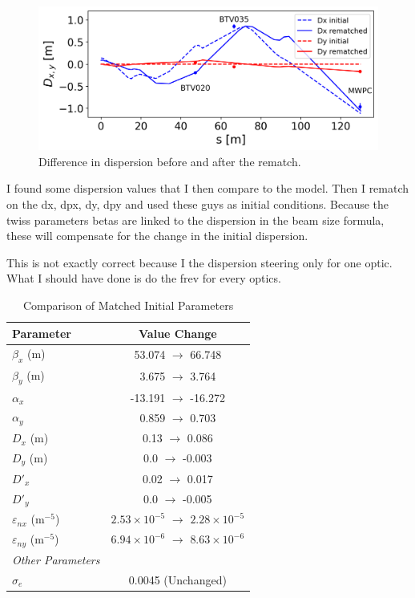 \documentclass[a4paper,
               ]{jacow}
\begin{document}
\begin{figure}[!htb]
   \centering
   \includegraphics*[width=1.0\columnwidth]{dispersion_diff.png}
   \caption{Difference in dispersion before and after the rematch.}
   \label{fig:dispersion}
\end{figure}

I found some dispersion values that I then compare to the model. Then I rematch on the dx, dpx, dy, dpy and used these guys as initial conditions. Because the twiss parameters betas are linked to the dispersion in the beam size formula, these will compensate for the change in the initial dispersion.

This is not exactly correct because I the dispersion steering only for one optic. What I should have done is do the frev for every optics.

\begin{table}[h!]
    \centering
    \caption{Comparison of Matched Initial Parameters}
    \label{tab:initial_conditions_comparison_single_col}
    \begin{tabular}{l c}
        \hline
        Parameter & Value Change \\
        \hline
        $\beta_x$ (m) & 53.074 \(\rightarrow\) 66.748 \\
        $\beta_y$ (m) & 3.675 \(\rightarrow\) 3.764 \\
        $\alpha_x$ & -13.191 \(\rightarrow\) -16.272 \\
        $\alpha_y$ & 0.859 \(\rightarrow\) 0.703 \\
        $D_x$ (m) & 0.13 \(\rightarrow\) 0.086 \\
        $D_y$ (m) & 0.0 \(\rightarrow\) -0.003 \\
        $D'_x$ & 0.02 \(\rightarrow\) 0.017 \\
        $D'_y$ & 0.0 \(\rightarrow\) -0.005 \\
        $\varepsilon_{nx}$ ($\text{m}^{-5}$) & $2.53 \times 10^{-5}$ \(\rightarrow\) $2.28 \times 10^{-5}$ \\
        $\varepsilon_{ny}$ ($\text{m}^{-5}$) & $6.94 \times 10^{-6}$ \(\rightarrow\) $8.63 \times 10^{-6}$ \\
        \hline
        \textit{Other Parameters} & \\
        \hline
        $\sigma_e$ & 0.0045 (Unchanged) \\
        \hline
    \end{tabular}
\end{table}
\end{document}
